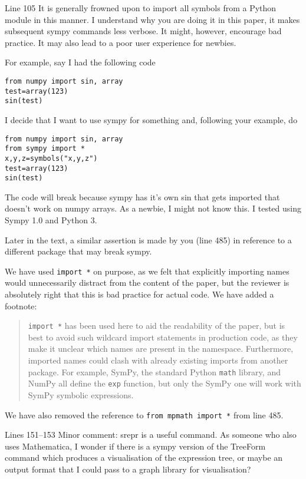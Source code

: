 \documentclass[answers,12pt]{exam}
\begin{document}
\begin{questions}
\question Line 105
It is generally frowned upon to import all symbols from a Python module in this manner.
I understand why you are doing it in this paper, it makes subsequent sympy commands less verbose.
It might, however, encourage bad practice. It may also lead to a poor user experience for newbies.
\label{rev1point1}

For example, say I had the following code

\begin{verbatim}
from numpy import sin, array
test=array(123)
sin(test)
\end{verbatim}

I decide that I want to use sympy for something and, following your example, do

\begin{verbatim}
from numpy import sin, array
from sympy import *
x,y,z=symbols("x,y,z")
test=array(123)
sin(test)
\end{verbatim}

The code will break because sympy has it's own sin that gets imported that doesn't work on numpy arrays. As a newbie, I might not know this.
I tested using Sympy 1.0 and Python 3.

Later in the text, a similar assertion is made by you (line 485) in reference to a different package that may break sympy.

\begin{solution}
We have used \verb|import *| on purpose, as we felt that explicitly importing
names would unnecessarily distract from the content of the paper, but the
reviewer is absolutely right that this is bad practice for actual code. We
have added a footnote:
\begin{quote}\texttt{import *} has been used here to aid the
  readability of the paper, but is best to avoid such wildcard import
  statements in production code, as they make it unclear which names are
  present in the namespace. Furthermore, imported names could clash with
  already existing imports from another package. For example, SymPy, the
  standard Python \texttt{math} library, and NumPy all define the \texttt{exp}
  function, but only the SymPy one will work with SymPy symbolic expressions.
\end{quote}

We have also removed the reference to \texttt{from mpmath import *} from line 485.
\end{solution}

\question Lines 151--153
Minor comment: srepr is a useful command. As someone who also uses Mathematica, I wonder if there is a sympy version of the TreeForm command which produces a visualisation of the expression tree, or maybe an output format that I could pass to a graph library for visualisation?


\end{questions}
\end{document}
